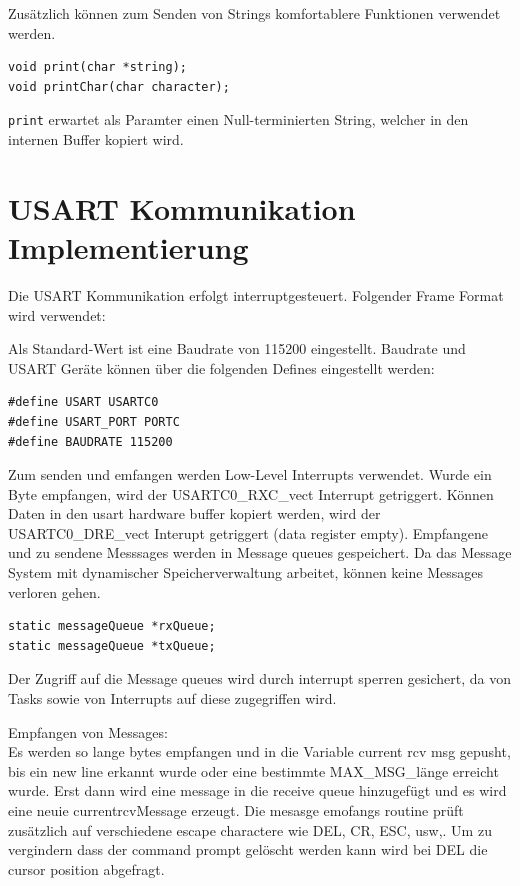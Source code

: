\documentclass[fontsize=12pt, toc=bibliography, notitlepage]{scrreprt}
\begin{document}
Zusätzlich können zum Senden von Strings komfortablere Funktionen verwendet werden.

\begin{lstlisting}
void print(char *string);
void printChar(char character);
\end{lstlisting}

\lstinline$print$ erwartet als Paramter einen Null-terminierten String, welcher in den internen Buffer kopiert wird.

\section{USART Kommunikation Implementierung}
\label{subsec:shell-communication-impl}
Die USART Kommunikation erfolgt interruptgesteuert. Folgender Frame Format wird verwendet:

Als Standard-Wert ist eine Baudrate von 115200 eingestellt. Baudrate und USART Geräte können über die folgenden Defines eingestellt werden:

\begin{lstlisting}
#define USART USARTC0
#define USART_PORT PORTC
#define BAUDRATE 115200
\end{lstlisting}

Zum senden und emfangen werden Low-Level Interrupts verwendet. Wurde ein Byte empfangen, wird der USARTC0\_RXC\_vect Interrupt getriggert. Können Daten in den usart hardware buffer kopiert werden, wird der USARTC0\_DRE\_vect Interupt getriggert (data register empty). Empfangene und zu sendene Messsages werden in Message queues gespeichert. Da das Message System mit dynamischer Speicherverwaltung arbeitet, können keine Messages verloren gehen.

\begin{lstlisting}
static messageQueue *rxQueue;
static messageQueue *txQueue;
\end{lstlisting}

Der Zugriff auf die Message queues wird durch interrupt sperren gesichert, da von Tasks sowie von Interrupts auf diese zugegriffen wird.

Empfangen von Messages: \\
Es werden so lange bytes empfangen und in die Variable current rcv msg gepusht, bis ein new line erkannt wurde oder eine bestimmte MAX\_MSG\_länge erreicht wurde. Erst dann wird eine message in die receive queue hinzugefügt und es wird eine neuie currentrcvMessage erzeugt. Die mesasge emofangs routine prüft zusätzlich auf verschiedene escape charactere wie DEL, CR, ESC, usw,. Um zu vergindern dass der command prompt gelöscht werden kann wird bei DEL die cursor position abgefragt.
\end{document}
